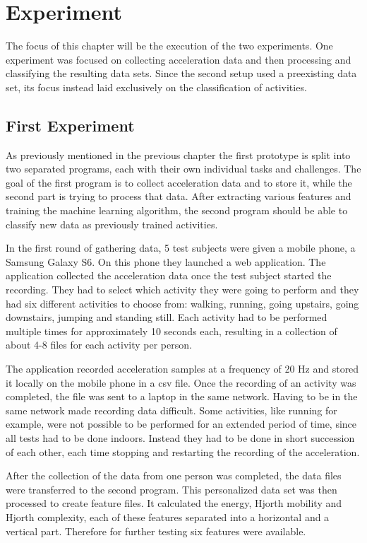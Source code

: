 \section{Experiment}
\label{section:experiment}
The focus of this chapter will be the execution of the two experiments. One experiment was focused on collecting acceleration data and then processing and classifying the resulting data sets. Since the second setup used a preexisting data set, its focus instead laid exclusively on the classification of activities.

\subsection{First Experiment}
As previously mentioned in the previous chapter the first prototype is split into two separated programs, each with their own individual tasks and challenges. The goal of the first program is to collect acceleration data and to store it, while the second part is trying to process that data. After extracting various features and training the machine learning algorithm, the second program should be able to classify new data as previously trained activities.

In the first round of gathering data, 5 test subjects were given a mobile phone, a Samsung Galaxy S6. On this phone they launched a web application. The application collected the acceleration data once the test subject started the recording. They had to select which activity they were going to perform and they had six different activities to choose from: walking, running, going upstairs, going downstairs, jumping and standing still. Each activity had to be performed multiple times for approximately 10 seconds each, resulting in a collection of about 4-8 files for each activity per person.

The application recorded acceleration samples at a frequency of 20 Hz and stored it locally on the mobile phone in a \gls{csv} file. Once the recording of an activity was completed, the file was sent to a laptop in the same network. Having to be in the same network made recording data difficult. Some activities, like running for example, were not possible to be performed for an extended period of time, since all tests had to be done indoors. Instead they had to be done in short succession of each other, each time stopping and restarting the recording of the acceleration.

After the collection of the data from one person was completed, the data files were transferred to the second program. This personalized data set was then processed to create feature files. It calculated the energy, Hjorth mobility and Hjorth complexity, each of these features separated into a horizontal and a vertical part. Therefore for further testing six features were available.

